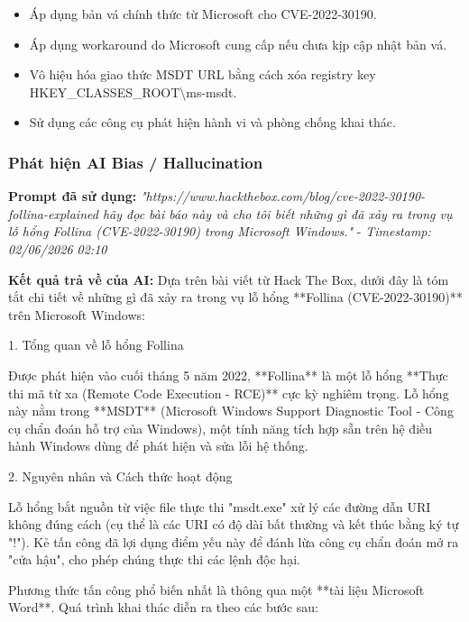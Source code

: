 \begin{itemize}
    \item Áp dụng bản vá chính thức từ Microsoft cho CVE-2022-30190.
    \item Áp dụng workaround do Microsoft cung cấp nếu chưa kịp cập nhật bản vá.
    \item Vô hiệu hóa giao thức MSDT URL bằng cách xóa registry key HKEY\_CLASSES\_ROOT\textbackslash ms-msdt.
    \item Sử dụng các công cụ phát hiện hành vi và phòng chống khai thác.
\end{itemize}

\subsubsection{Phát hiện AI Bias / Hallucination}
\textbf{Prompt đã sử dụng:} \textit{"{https://www.hackthebox.com/blog/cve-2022-30190-follina-explained} hãy đọc bài báo này và cho tôi biết những gì đã xảy ra trong vụ lỗ hổng Follina (CVE-2022-30190) trong Microsoft Windows."} - \textit{Timestamp: 02/06/2026 02:10}

\textbf{Kết quả trả về của AI:}
Dựa trên bài viết từ Hack The Box, dưới đây là tóm tắt chi tiết về những gì đã xảy ra trong vụ lỗ hổng **Follina (CVE-2022-30190)** trên Microsoft Windows:

1. Tổng quan về lỗ hổng Follina

Được phát hiện vào cuối tháng 5 năm 2022, **Follina** là một lỗ hổng **Thực thi mã từ xa (Remote Code Execution - RCE)** cực kỳ nghiêm trọng. Lỗ hổng này nằm trong **MSDT** (Microsoft Windows Support Diagnostic Tool - Công cụ chẩn đoán hỗ trợ của Windows), một tính năng tích hợp sẵn trên hệ điều hành Windows dùng để phát hiện và sửa lỗi hệ thống.

2. Nguyên nhân và Cách thức hoạt động

Lỗ hổng bắt nguồn từ việc file thực thi "msdt.exe" xử lý các đường dẫn URI không đúng cách (cụ thể là các URI có độ dài bất thường và kết thúc bằng ký tự "!"). Kẻ tấn công đã lợi dụng điểm yếu này để đánh lừa công cụ chẩn đoán mở ra "cửa hậu", cho phép chúng thực thi các lệnh độc hại.

Phương thức tấn công phổ biến nhất là thông qua một **tài liệu Microsoft Word**. Quá trình khai thác diễn ra theo các bước sau:

